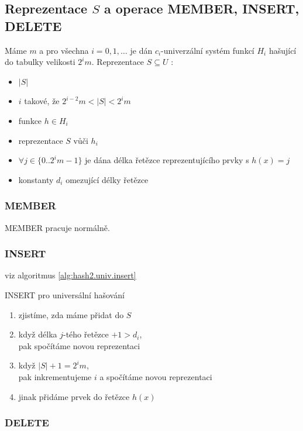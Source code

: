 \subsection{Reprezentace $S$ a operace MEMBER, INSERT, DELETE}

Máme $m$ a pro všechna $i = 0, 1, \ldots$ je dán $c_i$-univerzální
systém funkcí $H_i$ hašující do tabulky velikosti $2^i
m$. Reprezentace $S \subseteq U$ :
\begin{itemize}
\item $|S|$ 
\item $i$ takové, že $2^{i-2} m < |S| < 2^i m$ 
\item funkce $h \in H_i$ 
\item reprezentace $S$ vůči $h_i$ 
\item $\forall j \in \{ 0 .. 2^i m -1\}$ je dána délka řetězce
reprezentujícího prvky s $h(x)=j$ 
\item konstanty $d_i$ omezující délky řetězce
\end{itemize}

\subsubsection{MEMBER}

MEMBER pracuje normálně.

\subsubsection{INSERT}

viz algoritmus \ref{alg:hash2.univ.insert}

\begin{algorithm}[!htb]
\caption{INSERT pro universální hašování}
\label{alg:hash2.univ.insert}
\begin{enumerate}
\item zjistíme, zda máme přidat do $S$ 
\item když délka $j$-tého řetězce $+ 1 > d_i$,\\
 pak spočítáme novou reprezentaci
\item když $|S|+1 = 2^i m$,\\
 pak inkrementujeme $i$ a spočítáme novou reprezentaci
\item jinak přidáme prvek do řetězce $h(x)$ 
\end{enumerate}
\end{algorithm}

\subsubsection{DELETE}

